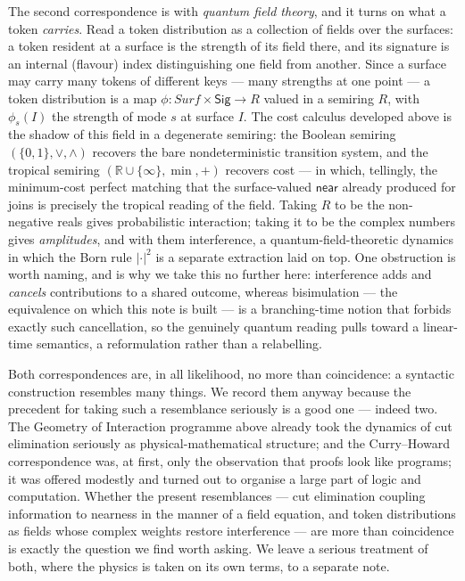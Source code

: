\documentclass[11pt]{article}
\theoremstyle{definition}
\theoremstyle{plain}
\newcommand{\near}{\mathsf{near}}
\newcommand{\Sig}{\mathsf{Sig}}
\begin{document}
The second correspondence is with \emph{quantum field theory}, and it
turns on what a token \emph{carries}. Read a token distribution as a
collection of fields over the surfaces: a token resident at a surface is
the strength of its field there, and its signature is an internal
(flavour) index distinguishing one field from another. Since a surface
may carry many tokens of different keys --- many strengths at one point
--- a token distribution is a map
$\phi : \mathit{Surf}\times\Sig \to R$ valued in a semiring $R$, with
$\phi_s(I)$ the strength of mode $s$ at surface $I$. The cost calculus
developed above is the shadow of this field in a degenerate semiring: the
Boolean semiring $(\{0,1\},\vee,\wedge)$ recovers the bare
nondeterministic transition system, and the tropical semiring
$(\mathbb{R}\cup\{\infty\},\min,+)$ recovers cost --- in which, tellingly,
the minimum-cost perfect matching that the surface-valued $\near$ already
produced for joins is precisely the tropical reading of the field. Taking
$R$ to be the non-negative reals gives probabilistic interaction; taking
it to be the complex numbers gives \emph{amplitudes}, and with them
interference, a quantum-field-theoretic dynamics in which the Born rule
$\lvert\cdot\rvert^2$ is a separate extraction laid on top. One
obstruction is worth naming, and is why we take this no further here:
interference adds and \emph{cancels} contributions to a shared outcome,
whereas bisimulation --- the equivalence on which this note is built ---
is a branching-time notion that forbids exactly such cancellation, so the
genuinely quantum reading pulls toward a linear-time semantics, a
reformulation rather than a relabelling.

Both correspondences are, in all likelihood, no more than coincidence: a
syntactic construction resembles many things. We record them anyway
because the precedent for taking such a resemblance seriously is a good
one --- indeed two. The Geometry of Interaction programme above already
took the dynamics of cut elimination seriously as physical-mathematical
structure; and the Curry--Howard correspondence was, at first, only the
observation that proofs look like programs; it was offered modestly and
turned out to organise a large part of logic and computation. Whether the present
resemblances --- cut elimination coupling information to nearness in the
manner of a field equation, and token distributions as fields whose
complex weights restore interference --- are more than coincidence is
exactly the question we find worth asking. We leave a serious treatment
of both, where the physics is taken on its own terms, to a separate note.
\end{document}
